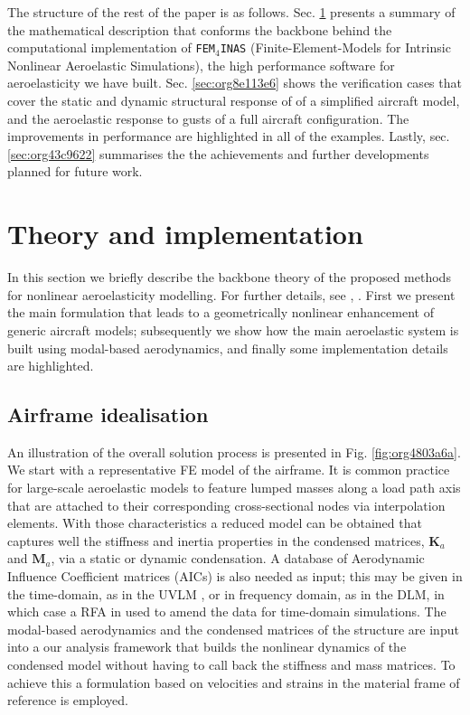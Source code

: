 \documentclass[11pt]{article}
\begin{document}
The structure of the rest of the paper is as follows. Sec. \ref{sec:orgc28c18f} presents a summary of the mathematical description that conforms the backbone behind the computational implementation of \texttt{FEM$_4$INAS} (Finite-Element-Models for Intrinsic Nonlinear Aeroelastic Simulations), the high performance software for aeroelasticity we have built. Sec. \ref{sec:org8e113e6} shows the verification cases that cover the static and dynamic structural response of of a simplified aircraft model, and the aeroelastic response to gusts of a full aircraft configuration. The improvements in performance are highlighted in all of the examples. 
Lastly, sec. \ref{sec:org43c9622} summarises the the achievements and further developments planned for future work.

\section{Theory and implementation}
\label{sec:orgc28c18f}
In this section we briefly describe the backbone theory of the proposed methods for nonlinear aeroelasticity modelling. For further details, see \cite{CEA2021}, \cite{CEA2023}. First we present the main formulation that leads to a geometrically nonlinear enhancement of generic aircraft models; subsequently we show how the main aeroelastic system is built using modal-based aerodynamics, and finally some implementation details are highlighted.
\subsection{Airframe idealisation}
\label{sec:org54afc33}
An illustration of the overall solution process is presented in Fig. \ref{fig:org4803a6a}.  
We start with a representative FE model of the airframe. It is common practice for large-scale aeroelastic models to feature lumped masses along a load path axis that are attached to their corresponding cross-sectional nodes via interpolation elements. With those characteristics  a reduced model can be obtained that captures well the stiffness and inertia properties in the condensed matrices, \(\pmb{K}_a\) and \(\pmb{M}_a\), via a static or dynamic condensation.
A database of Aerodynamic Influence Coefficient matrices (AICs) is also needed as input; this may be given in the time-domain, as in the UVLM \cite{Maraniello2019}, or in frequency domain, as in the DLM, in which case a RFA in used to amend the data for time-domain simulations.
The modal-based aerodynamics and the condensed matrices of the structure are input into a our analysis framework that builds the nonlinear dynamics of the condensed model without having to call back the stiffness and mass matrices. To achieve this a formulation based on velocities and strains in the material frame of reference is employed. 
\end{document}
